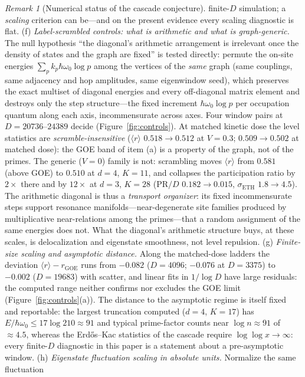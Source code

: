 \documentclass[11pt,a4paper]{article}
\theoremstyle{plain}
\theoremstyle{definition}
\theoremstyle{remark}
\newtheorem{remark}[theorem]{Remark}
\begin{document}
\begin{remark}[Numerical status of the cascade conjecture]
finite-$D$ simulation; a \emph{scaling} criterion can be---and on the present evidence
every scaling diagnostic is flat.
(f) \emph{Label-scrambled controls: what is arithmetic and what is graph-generic.} The
null hypothesis ``the diagonal's arithmetic arrangement is irrelevant once the density of
states and the graph are fixed'' is tested directly: permute the on-site energies
$\sum_{p}k_{p}\hbar\omega_{0}\log p$ among the vertices of the \emph{same} graph (same
couplings, same adjacency and hop amplitudes, same eigenwindow seed), which preserves the
exact multiset of diagonal energies and every off-diagonal matrix element and destroys only
the step structure---the fixed increment $\hbar\omega_{0}\log p$ per occupation quantum
along each axis, incommensurate across axes. Four window pairs at $D=20736$--$24389$ decide
(Figure~\ref{fig:controls}). At matched kinetic dose the level statistics are
\emph{scramble-insensitive} ($\langle r\rangle$ $0.518\to0.512$ at $V=0.3$;
$0.509\to0.502$ at matched dose): the GOE band of item (a) is a property of the graph, not
of the primes. The generic ($V=0$) family is not: scrambling moves $\langle r\rangle$ from
$0.581$ (above GOE) to $0.510$ at $d=4$, $K=11$, and collapses the participation ratio by
$2\times$ there and by $12\times$ at $d=3$, $K=28$ ($\mathrm{PR}/D$ $0.182\to0.015$,
$\sigma_{\mathrm{ETH}}$ $1.8\to4.5$). The arithmetic diagonal is thus a \emph{transport
organizer}: its fixed incommensurate steps support resonance manifolds---near-degenerate
site families produced by multiplicative near-relations among the primes---that a random
assignment of the same energies does not. What the diagonal's arithmetic structure buys, at
these scales, is delocalization and eigenstate smoothness, not level repulsion.
(g) \emph{Finite-size scaling and asymptotic distance.} Along the matched-dose ladders the
deviation $\langle r\rangle-r_{\mathrm{GOE}}$ runs from $-0.082$ ($D=4096$; $-0.076$ at $D=3375$) to $-0.002$
($D=19683$) with scatter, and linear fits in $1/\log D$ have large residuals: the computed
range neither confirms nor excludes the GOE limit (Figure~\ref{fig:controls}(a)). The
distance to the asymptotic regime is itself fixed and reportable: the largest truncation
computed ($d=4$, $K=17$) has $E/\hbar\omega_{0}\leq17\log210\approx91$ and typical
prime-factor counts near $\log n\approx91$ of $\approx4.5$, whereas the
Erd\H{o}s--Kac statistics of the cascade require $\log\log x\to\infty$: every
finite-$D$ diagnostic in this paper is a statement about a pre-asymptotic window.
(h) \emph{Eigenstate fluctuation scaling in absolute units.} Normalize the same fluctuation

\end{remark}
\end{document}
